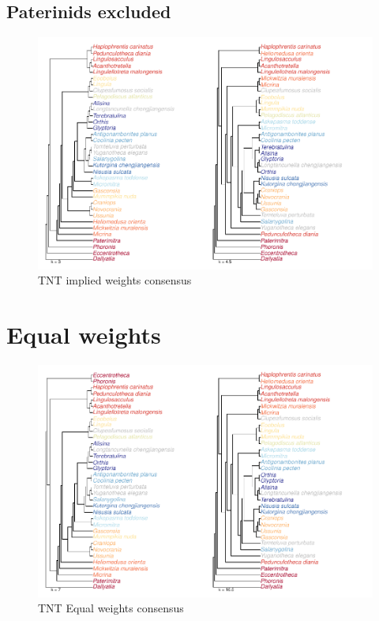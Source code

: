 \documentclass[]{book}
\theoremstyle{definition}
\theoremstyle{definition}
\theoremstyle{definition}
\theoremstyle{remark}
\begin{document}
\hypertarget{paterinids-excluded}{%
\subsection{Paterinids excluded}\label{paterinids-excluded}}

\begin{figure}
\centering
\includegraphics{Brachiopod_phylogeny_files/figure-latex/unnamed-chunk-8-1.pdf}
\caption{\label{fig:unnamed-chunk-8}TNT implied weights consensus}
\end{figure}

\hypertarget{equal-weights}{%
\section{Equal weights}\label{equal-weights}}

\begin{figure}
\centering
\includegraphics{Brachiopod_phylogeny_files/figure-latex/unnamed-chunk-9-1.pdf}
\caption{\label{fig:unnamed-chunk-9}TNT Equal weights consensus}
\end{figure}
\end{document}
